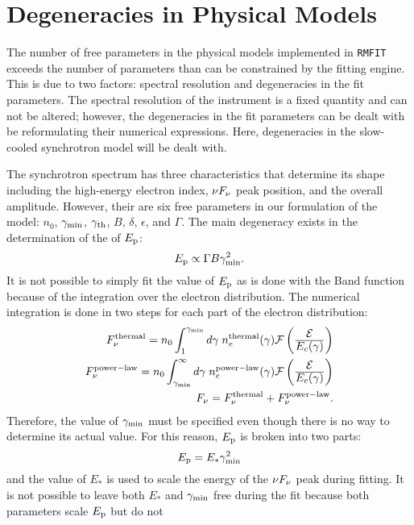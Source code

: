 \chapter{Degeneracies in Physical Models}
\label{ch:degen}
The number of free parameters in the physical models implemented in
{\tt RMFIT} exceeds the number of parameters than can be constrained
by the fitting engine. This is due to two factors: spectral resolution
and degeneracies in the fit parameters. The spectral resolution of the
instrument is a fixed quantity and can not be altered; however, the
degeneracies in the fit parameters can be dealt with be reformulating
their numerical expressions. Here, degeneracies in the slow-cooled
synchrotron model will be dealt with.


The synchrotron spectrum has three characteristics that determine its
shape including the high-energy electron index, $\nu F_{\nu}$ peak position,
and the overall amplitude. However, their are six free parameters in
our formulation of the model: $n_0$, $\gamma_{\rm min}$, $\gamma_{\rm th}$, $B$,
$\delta$, $\epsilon$, and $\Gamma$. The main degeneracy exists in the determination of the of $E_{\rm p}$:
\begin{equation}
  \label{eq:epdeg}
  E_{\rm p} \propto \Gamma B \gamma_{\rm min}^2.
\end{equation}
It is not possible to simply fit the value of $E_{\rm p}$ as is done with
the Band function because of the integration over the electron
distribution. The numerical integration is done in two steps for each
part of the electron distribution:
\begin{eqnarray}
  \label{eq:n}
  \Fv^{\rm thermal}=n_0\int_1^{\gammaMin} d\gamma\; n_e^{\rm thermal}(\gamma)\mathcal{F}\left(\dover{\mathcal{E}}{E_c(\gamma)} \right)\\
\Fv^{\rm power-law}=n_0\int_{\gammaMin}^{\infty} d\gamma\; n_e^{\rm power-law}(\gamma)\mathcal{F}\left(\dover{\mathcal{E}}{E_c(\gamma)} \right)\\
\Fv = \Fv^{\rm thermal} + \Fv^{\rm power-law}.
\end{eqnarray}
Therefore, the value of $\gamma_{\rm min}$ must be specified even though
there is no way to determine its actual value. For this reason, $E_{\rm p}$
is broken into two parts:
\begin{equation}
  \label{eq:estar}
  E_{\rm p} = E_*\gamma_{\rm min}^2
\end{equation}
and the value of $E_*$ is used to scale the energy of the $\nu F_{\nu}$ peak
during fitting. It is not possible to leave both $E_*$ and $\gamma_{\rm min}$
free during the fit because both parameters scale $E_{\rm p}$ but do not
